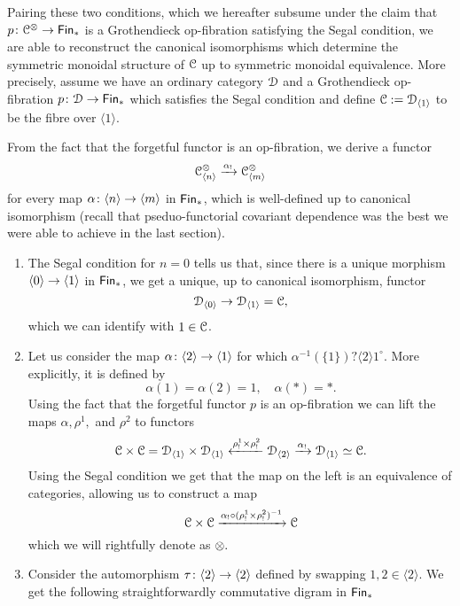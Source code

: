 \begin{construction}
Pairing these two conditions, which we hereafter subsume under the claim that $p\colon \mathcal C^\otimes \rightarrow \operatorname{\sf Fin}_\ast$ is a Grothendieck op-fibration satisfying the Segal condition, we are able to reconstruct the canonical isomorphisms which determine the symmetric monoidal structure of $\mathcal C$ up to symmetric monoidal equivalence. More precisely, assume we have an ordinary category $\mathcal D$ and a Grothendieck op-fibration $p\colon \mathcal D \rightarrow \operatorname{\sf Fin}_\ast$ which satisfies the Segal condition and define $\mathcal C := \mathcal D_{\langle 1 \rangle}$ to be the fibre over $\langle 1 \rangle.$
\begin{remark}
    From the fact that the forgetful functor is an op-fibration, we derive a functor $$\mathcal C^{\otimes}_{\langle n\rangle} \xrightarrow{\alpha_!} \mathcal C^{\otimes}_{\langle m \rangle}$$ for every map $\alpha\colon \langle n \rangle \rightarrow \langle m \rangle$ in $\operatorname{\sf Fin}_\ast$, which is well-defined up to canonical isomorphism (recall that pseduo-functorial covariant dependence was the best we were able to achieve in the last section).
\end{remark}
\begin{enumerate}
    \item The Segal condition for $n=0$ tells us that, since there is a unique morphism $\langle 0 \rangle \rightarrow \langle 1 \rangle$ in $\operatorname{\sf Fin}_\ast$, we get a unique, up to canonical isomorphism, functor \[\mathcal D_{\langle 0 \rangle} \rightarrow \mathcal D_{\langle 1 \rangle} = \mathcal C,\] which we can identify with $1\in \mathcal C$. 
    \item Let us consider the map $\alpha\colon \langle 2 \rangle \rightarrow \langle 1 \rangle $ for which $\alpha^{-1}(\{1\})?\langle 2 \rangle 1^{\circ}$. More explicitly, it is defined by \[\alpha(1)=\alpha(2)=1, \quad \alpha(\ast)=\ast.\] Using the fact that the forgetful functor $p$ is an op-fibration we can lift the maps $\alpha,\rho^1,$ and $\rho^2$ to functors \[\mathcal C\times\mathcal C =\mathcal D_{\langle 1 \rangle}\times\mathcal D_{\langle 1 \rangle}\xleftarrow{\rho^{1}_!\times \rho^{2}_!}\mathcal D_{\langle 2 \rangle} \xrightarrow{\alpha_!} \mathcal D_{\langle 1\rangle}\simeq \mathcal C.\] Using the Segal condition we get that the map on the left is an equivalence of categories, allowing us to construct a map \[\mathcal C\times \mathcal C \xrightarrow{\alpha_!\circ(\rho^{1}_!\times \rho^{2}_!)^{-1}} \mathcal C\] which we will rightfully denote as $\otimes.$
    \item Consider the automorphism $\tau\colon \langle 2 \rangle \rightarrow \langle 2 \rangle$ defined by swapping $1,2\in \langle 2 \rangle.$ We get the following straightforwardly commutative digram in $\operatorname{\sf Fin}_\ast$
    \[\begin{tikzcd}[ampersand replacement=\&]

\end{tikzcd}\]
\end{enumerate}
\end{construction}
